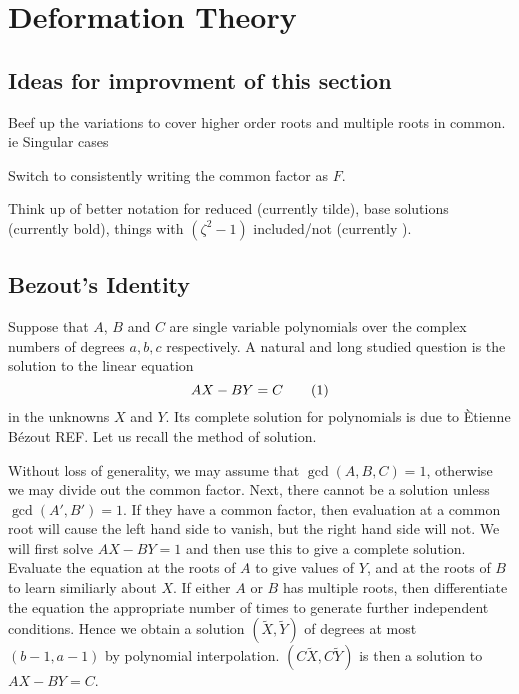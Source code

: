 
\section{Deformation Theory}
\label{sec:Deformation Theory}

\subsection{Ideas for improvment of this section}
\label{sec:Ideas for improvment}
Beef up the variations to cover higher order roots and multiple roots in common. ie Singular cases

Switch to consistently writing the common factor as $F$.

Think up of better notation for reduced (currently tilde), base solutions (currently bold), things with $(ζ^2-1)$ included/not (currently ).






















\subsection{Bezout's Identity}
\label{sub:Bezout's Identity}
Suppose that $A$, $B$ and $C$ are single variable polynomials over the complex numbers of degrees $a,b,c$ respectively. A natural and long studied question is the solution to the linear equation
\[
AX - BY = C
\labelthis{eqn:Bezout}
\]
in the unknowns $X$ and $Y$. Its complete solution for polynomials is due to \`Etienne B\'ezout REF. Let us recall the method of solution.

Without loss of generality, we may assume that $\gcd(A,B,C) = 1$, otherwise we may divide out the common factor. Next, there cannot be a solution unless $\gcd(A',B') = 1$. If they have a common factor, then evaluation at a common root will cause the left hand side to vanish, but the right hand side will not. We will first solve $AX-BY = 1$ and then use this to give a complete solution. Evaluate the equation at the roots of $A$ to give values of $Y$, and at the roots of $B$ to learn similiarly about $X$. If either $A$ or $B$ has multiple roots, then differentiate the equation the appropriate number of times to generate further independent conditions. Hence we obtain a solution $(\tilde{X},\tilde{Y})$ of degrees at most $(b-1,a-1)$ by polynomial interpolation. $(C\tilde{X}, C\tilde{Y})$ is then a solution to $AX - BY = C$.

